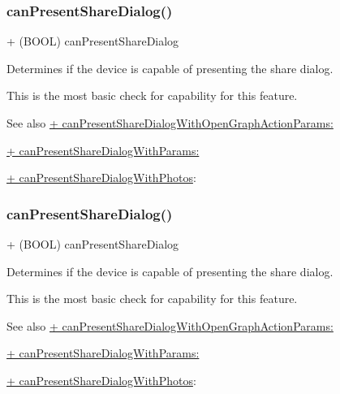 \subsubsection{\texorpdfstring{can\+Present\+Share\+Dialog()}{canPresentShareDialog()}\hspace{0.1cm}{\footnotesize\ttfamily [1/5]}}
{\footnotesize\ttfamily + (B\+O\+OL) can\+Present\+Share\+Dialog \begin{DoxyParamCaption}{ }\end{DoxyParamCaption}}

Determines if the device is capable of presenting the share dialog.

This is the most basic check for capability for this feature.

\begin{DoxySeeAlso}{See also}
\hyperlink{interfaceFBDialogs_ad8921a3906d28210cad0c0871e99f4bd}{+ can\+Present\+Share\+Dialog\+With\+Open\+Graph\+Action\+Params\+:} 

\hyperlink{interfaceFBDialogs_a36e9e390bb8c6040e6027b647ed587e8}{+ can\+Present\+Share\+Dialog\+With\+Params\+:} 

\hyperlink{interfaceFBDialogs_a16156d6a4664e4ea55e351bc78b6e8a7}{+ can\+Present\+Share\+Dialog\+With\+Photos}\+: 
\end{DoxySeeAlso}
\mbox{\label{interfaceFBDialogs_a017ecb9200d66140929cce227723a4d5}} 
\subsubsection{\texorpdfstring{can\+Present\+Share\+Dialog()}{canPresentShareDialog()}\hspace{0.1cm}{\footnotesize\ttfamily [2/5]}}
{\footnotesize\ttfamily + (B\+O\+OL) can\+Present\+Share\+Dialog \begin{DoxyParamCaption}{ }\end{DoxyParamCaption}}

Determines if the device is capable of presenting the share dialog.

This is the most basic check for capability for this feature.

\begin{DoxySeeAlso}{See also}
\hyperlink{interfaceFBDialogs_ad8921a3906d28210cad0c0871e99f4bd}{+ can\+Present\+Share\+Dialog\+With\+Open\+Graph\+Action\+Params\+:} 

\hyperlink{interfaceFBDialogs_a36e9e390bb8c6040e6027b647ed587e8}{+ can\+Present\+Share\+Dialog\+With\+Params\+:} 

\hyperlink{interfaceFBDialogs_a16156d6a4664e4ea55e351bc78b6e8a7}{+ can\+Present\+Share\+Dialog\+With\+Photos}\+: 
\end{DoxySeeAlso}
\mbox{\label{interfaceFBDialogs_a017ecb9200d66140929cce227723a4d5}} 
